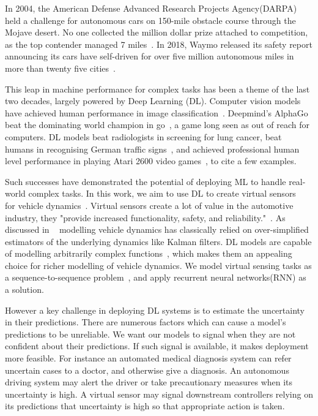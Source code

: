 \documentclass[../main.tex]{subfiles}
\begin{document}
In 2004, the American Defense Advanced Research Projects Agency(DARPA) held a challenge for autonomous cars on 150-mile obstacle course through the Mojave desert. No one collected the million dollar prize attached to competition, as the top contender managed 7 miles~\citep{darpa2004}. In 2018, Waymo released its safety report announcing its cars have self-driven for over five million autonomous miles in more than twenty five cities~\citep{waymo2018safety}.  

This leap in machine performance for complex tasks has been a theme of the last two decades, largely powered by Deep Learning (DL). Computer vision models have achieved human performance in image classification~\citep{he2015delving}. Deepmind's AlphaGo beat the dominating world champion in go~\citep{silver2017mastering}, a game long seen as out of reach for computers. DL models beat radiologists in screening for lung cancer\citep{ardila2019end}, beat humans in recognising German traffic signs~\citep{cirecsan2012multi}, and achieved professional human level performance in playing Atari 2600 video games~\citep{mnih2015human}, to cite a few examples.

Such successes have demonstrated the potential of deploying ML to handle real-world complex tasks. In this work, we aim to use DL to create virtual sensors~\citep{li2011review} for vehicle dynamics~\citep{schramm2014vehicle}. Virtual sensors create a lot of value in the automotive industry, they "provide increased functionality, safety, and reliability."~\citep{li2011review}. As discussed in ~\citep{graber2018hybrid} modelling vehicle dynamics has classically relied on over-simplified estimators of the underlying dynamics like Kalman filters. DL models are capable of modelling arbitrarily complex functions~\citep{goodfellow2016deep}, which makes them an appealing choice for richer modelling of vehicle dynamics\citep{graber2018hybrid}. We model virtual sensing tasks as a sequence-to-sequence problem~\citep{goodfellow2016deep}, and apply recurrent neural networks(RNN) as a solution.

However a key challenge in deploying DL systems is to estimate the uncertainty in their predictions. There are numerous factors which can cause a model's predictions to be unreliable. We want our models to signal when they are not confident about their predictions. If such signal is available, it makes deployment more feasible. For instance an automated medical diagnosis system can refer uncertain cases to a doctor, and otherwise give a diagnosis. An autonomous driving system may alert the driver or take precautionary measures when its uncertainty is high. A virtual sensor may signal downstream controllers relying on its predictions that uncertainty is high so that appropriate action is taken. 
\end{document}
